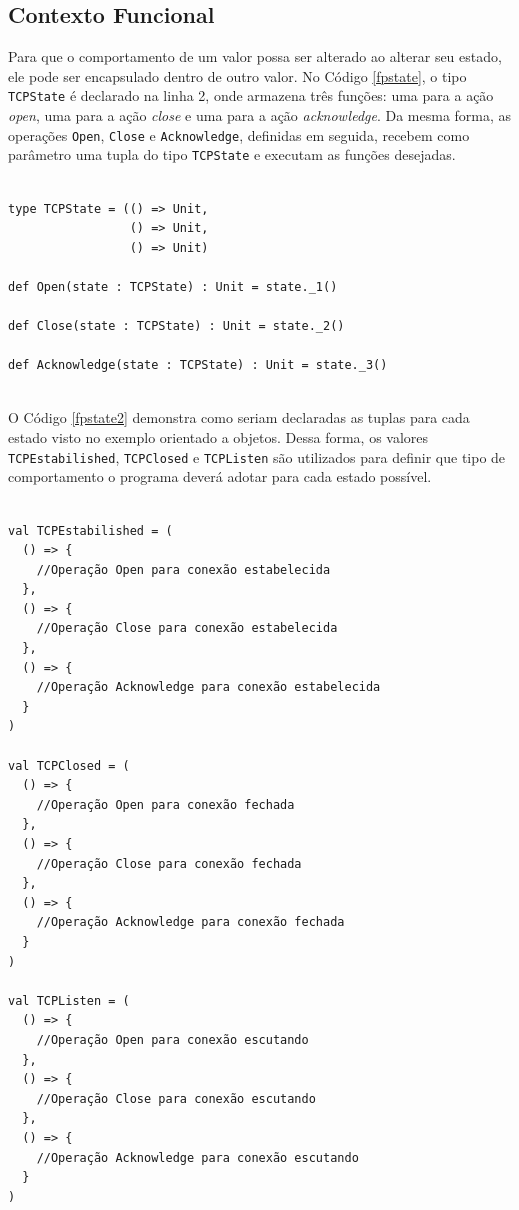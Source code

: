 \subsection*{Contexto Funcional}

Para que o comportamento de um valor possa 
ser alterado ao alterar seu estado, ele 
pode ser encapsulado dentro de outro valor. 
No Código \ref{fpstate}, o tipo \texttt{TCPState} 
é declarado na linha 2, onde armazena 
três funções: uma para a ação \textit{open}, 
uma para a ação \textit{close} e uma para 
a ação \textit{acknowledge}. Da mesma forma, 
as operações \texttt{Open}, \texttt{Close} e \texttt{Acknowledge}, 
definidas em seguida, recebem como 
parâmetro uma tupla do tipo \texttt{TCPState} e 
executam as funções desejadas.

\begin{lstlisting}[caption={\textit{State} Funcional.},label=fpstate]
    
type TCPState = (() => Unit,
                 () => Unit,
                 () => Unit)

def Open(state : TCPState) : Unit = state._1()

def Close(state : TCPState) : Unit = state._2()

def Acknowledge(state : TCPState) : Unit = state._3()
    
\end{lstlisting}

O Código \ref{fpstate2} demonstra como seriam 
declaradas as tuplas para cada estado visto 
no exemplo orientado a objetos. Dessa forma, 
os valores \texttt{TCPEstabilished}, \texttt{TCPClosed} e 
\texttt{TCPListen} são utilizados para definir que 
tipo de comportamento o programa deverá 
adotar para cada estado possível.

\begin{lstlisting}[caption={\textit{State} Funcional.},label=fpstate2]
    
val TCPEstabilished = (
  () => {
    //Operação Open para conexão estabelecida
  },
  () => {
    //Operação Close para conexão estabelecida
  },
  () => {
    //Operação Acknowledge para conexão estabelecida
  }
)

val TCPClosed = (
  () => {
    //Operação Open para conexão fechada
  },
  () => {
    //Operação Close para conexão fechada
  },
  () => {
    //Operação Acknowledge para conexão fechada
  }
)

val TCPListen = (
  () => {
    //Operação Open para conexão escutando
  },
  () => {
    //Operação Close para conexão escutando
  },
  () => {
    //Operação Acknowledge para conexão escutando
  }
)
    
\end{lstlisting}
